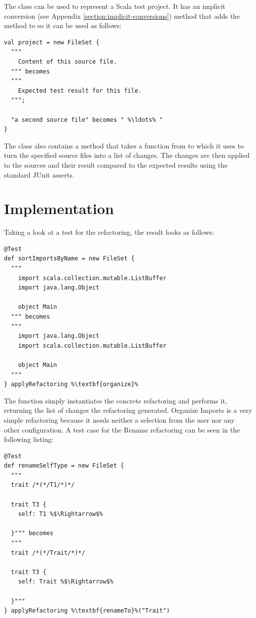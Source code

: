 \documentclass[10pt,a4paper,oneside]{scrreprt}
\begin{document}
The  class can be used to represent a Scala test project. It has an implicit conversion (see Appendix \vref{section:implicit-conversions}) method that adds the  method to  so it can be used as follows:

\begin{lstlisting}
val project = new FileSet {
  """
    Content of this source file.
  """ becomes
  """
    Expected test result for this file.
  """;

  "a second source file" becomes " %\ldots% "
}
\end{lstlisting}

The  class also contains a method  that takes a function from  to  which it uses to turn the specified source files into a list of changes. The changes are then applied to the sources and their result compared to the expected results using the standard JUnit asserts.

\section{Implementation}

Taking a look at a test for the  refactoring, the result looks as follows:

\begin{lstlisting}
@Test
def sortImportsByName = new FileSet {
  """
    import scala.collection.mutable.ListBuffer
    import java.lang.Object

    object Main
  """ becomes
  """
    import java.lang.Object
    import scala.collection.mutable.ListBuffer

    object Main
  """
} applyRefactoring %\textbf{organize}%
\end{lstlisting}

The  function simply instantiates the concrete refactoring and performs it, returning the list of changes the refactoring generated. Organize Imports is a very simple refactoring because it needs neither a selection from the user nor any other configuration. A test case for the Rename refactoring can be seen in the following listing:

\begin{lstlisting}
@Test
def renameSelfType = new FileSet {
  """
  trait /*(*/T1/*)*/

  trait T3 {
    self: T1 %$\Rightarrow$%

  }""" becomes
  """
  trait /*(*/Trait/*)*/

  trait T3 {
    self: Trait %$\Rightarrow$%

  }"""
} applyRefactoring %\textbf{renameTo}%("Trait")
\end{lstlisting}
\end{document}
